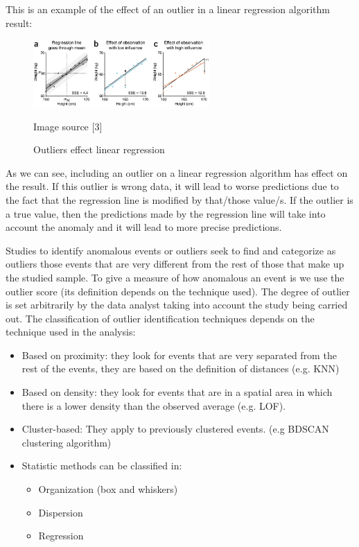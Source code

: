 \documentclass{article}
\begin{document}
This is an example of the effect of an outlier in a linear regression algorithm result:
\begin{figure}
    \centering
    \includegraphics[width=0.6\textwidth]{./images/outlierEffectExample.jpg}
    \caption{Outliers effect linear regression}
    Image source \label{fig:outliers_effect}[3]
\end{figure}
As we can see, including an outlier on a linear regression algorithm has effect on the result. If this outlier is wrong data, it will lead to worse predictions due to the fact that the regression line is modified by that/those value/s. If the outlier is a true value, then the predictions made by the regression line will take into account the anomaly and it will lead to more precise predictions.

Studies to identify anomalous events or outliers seek to find and categorize as outliers those events that are very different from the rest of those that make up the studied sample. To give a measure of how anomalous an event is we use the outlier score (its definition depends on the technique used). The degree of outlier is set arbitrarily by the data analyst taking into account the study being carried out.
The classification of outlier identification techniques depends on the technique used in the analysis:
\begin{itemize}
    \item Based on proximity: they look for events that are very separated from the rest of the events, they are based on the definition of distances (e.g. KNN)
    \item Based on density: they look for events that are in a spatial area in which there is a lower density than the observed average (e.g. LOF).
    \item Cluster-based: They apply to previously clustered events. (e.g BDSCAN clustering algorithm)
    \item Statistic methods can be classified in:
    \begin{itemize}
        \item Organization (box and whiskers)
        \item Dispersion
        \item Regression
    \end{itemize}
\end{itemize}
\end{document}

